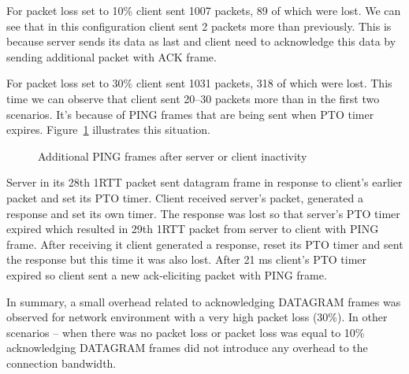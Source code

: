 For packet loss set to 10\% client sent 1007 packets, 89 of which were lost.
We can see that in this configuration client sent 2 packets more than previously.
This is because server sends its data as last and client need to acknowledge this data by sending additional packet with ACK frame.

For packet loss set to 30\% client sent 1031 packets, 318 of which were lost.
This time we can observe that client sent 20--30 packets more than in the first two scenarios.
It's because of PING frames that are being sent when PTO timer expires.
Figure~\ref{fig:dgram_ping_frames} illustrates this situation.

\begin{figure}[h]
    \centering
    \begin{sequencediagram}
    \end{sequencediagram}
    \caption{Additional PING frames after server or client inactivity}
    \label{fig:dgram_ping_frames}
\end{figure}


Server in its 28th 1RTT packet sent datagram frame in response to client's earlier packet and set its PTO timer.
Client received server's packet, generated a response and set its own timer.
The response was lost so that server's PTO timer expired which resulted in 29th 1RTT packet from server to client with PING frame.
After receiving it client generated a response, reset its PTO timer and sent the response but this time it was also lost.
After 21 ms client's PTO timer expired so client sent a new ack-eliciting packet with PING frame.

In summary, a small overhead related to acknowledging DATAGRAM frames was observed for network environment with a very
high packet loss (30\%).
In other scenarios -- when there was no packet loss or packet loss was equal to 10\% acknowledging DATAGRAM frames
did not introduce any overhead to the connection bandwidth.

